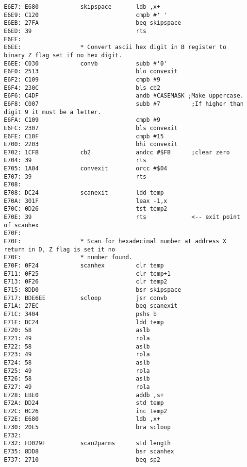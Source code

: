 {\begin{verbatim}
E6E7: E680            skipspace       ldb ,x+
E6E9: C120                            cmpb #' '
E6EB: 27FA                            beq skipspace
E6ED: 39                              rts
E6EE:                 
E6EE:                 * Convert ascii hex digit in B register to binary Z flag set if no hex digit. 
E6EE: C030            convb           subb #'0'
E6F0: 2513                            blo convexit
E6F2: C109                            cmpb #9
E6F4: 230C                            bls cb2
E6F6: C4DF                            andb #CASEMASK ;Make uppercase.
E6F8: C007                            subb #7         ;If higher than digit 9 it must be a letter.
E6FA: C109                            cmpb #9
E6FC: 2307                            bls convexit
E6FE: C10F                            cmpb #15
E700: 2203                            bhi convexit
E702: 1CFB            cb2             andcc #$FB      ;clear zero     
E704: 39                              rts
E705: 1A04            convexit        orcc #$04
E707: 39                              rts
E708:                 
E708: DC24            scanexit        ldd temp
E70A: 301F                            leax -1,x
E70C: 0D26                            tst temp2
E70E: 39                              rts             <-- exit point of scanhex
E70F:                 
E70F:                 * Scan for hexadecimal number at address X return in D, Z flag is set it no
E70F:                 * number found.
E70F: 0F24            scanhex         clr temp    
E711: 0F25                            clr temp+1
E713: 0F26                            clr temp2
E715: 8DD0                            bsr skipspace
E717: BDE6EE          scloop          jsr convb
E71A: 27EC                            beq scanexit
E71C: 3404                            pshs b
E71E: DC24                            ldd temp
E720: 58                              aslb
E721: 49                              rola
E722: 58                              aslb
E723: 49                              rola
E724: 58                              aslb
E725: 49                              rola
E726: 58                              aslb
E727: 49                              rola
E728: EBE0                            addb ,s+
E72A: DD24                            std temp
E72C: 0C26                            inc temp2
E72E: E680                            ldb ,x+
E730: 20E5                            bra scloop
E732:                 
E732: FD029F          scan2parms      std length
E735: 8DD8                            bsr scanhex
E737: 2710                            beq sp2

\end{verbatim}}
